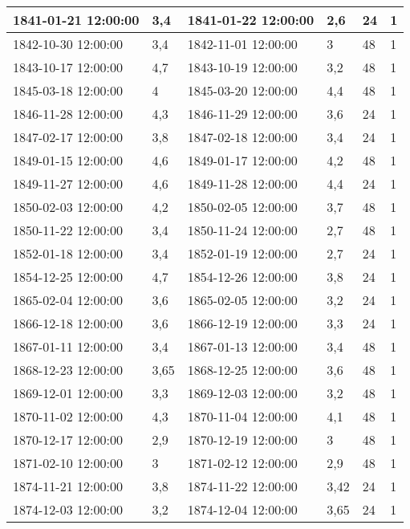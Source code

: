\documentclass[11pt]{article}
\begin{document}
\begin{longtable}{|l|p{2.3cm}|l|p{2.3cm}|l|l|}
        1841-01-21 12:00:00 & 3,4 & 1841-01-22 12:00:00 & 2,6 & 24 & 1 \\ \hline
        1842-10-30 12:00:00 & 3,4 & 1842-11-01 12:00:00 & 3 & 48 & 1 \\ \hline
        1843-10-17 12:00:00 & 4,7 & 1843-10-19 12:00:00 & 3,2 & 48 & 1 \\ \hline
        1845-03-18 12:00:00 & 4 & 1845-03-20 12:00:00 & 4,4 & 48 & 1 \\ \hline
        1846-11-28 12:00:00 & 4,3 & 1846-11-29 12:00:00 & 3,6 & 24 & 1 \\ \hline
        1847-02-17 12:00:00 & 3,8 & 1847-02-18 12:00:00 & 3,4 & 24 & 1 \\ \hline
        1849-01-15 12:00:00 & 4,6 & 1849-01-17 12:00:00 & 4,2 & 48 & 1 \\ \hline
        1849-11-27 12:00:00 & 4,6 & 1849-11-28 12:00:00 & 4,4 & 24 & 1 \\ \hline
        1850-02-03 12:00:00 & 4,2 & 1850-02-05 12:00:00 & 3,7 & 48 & 1 \\ \hline
        1850-11-22 12:00:00 & 3,4 & 1850-11-24 12:00:00 & 2,7 & 48 & 1 \\ \hline
        1852-01-18 12:00:00 & 3,4 & 1852-01-19 12:00:00 & 2,7 & 24 & 1 \\ \hline
        1854-12-25 12:00:00 & 4,7 & 1854-12-26 12:00:00 & 3,8 & 24 & 1 \\ \hline
        1865-02-04 12:00:00 & 3,6 & 1865-02-05 12:00:00 & 3,2 & 24 & 1 \\ \hline
        1866-12-18 12:00:00 & 3,6 & 1866-12-19 12:00:00 & 3,3 & 24 & 1 \\ \hline
        1867-01-11 12:00:00 & 3,4 & 1867-01-13 12:00:00 & 3,4 & 48 & 1 \\ \hline
        1868-12-23 12:00:00 & 3,65 & 1868-12-25 12:00:00 & 3,6 & 48 & 1 \\ \hline
        1869-12-01 12:00:00 & 3,3 & 1869-12-03 12:00:00 & 3,2 & 48 & 1 \\ \hline
        1870-11-02 12:00:00 & 4,3 & 1870-11-04 12:00:00 & 4,1 & 48 & 1 \\ \hline
        1870-12-17 12:00:00 & 2,9 & 1870-12-19 12:00:00 & 3 & 48 & 1 \\ \hline
        1871-02-10 12:00:00 & 3 & 1871-02-12 12:00:00 & 2,9 & 48 & 1 \\ \hline
        1874-11-21 12:00:00 & 3,8 & 1874-11-22 12:00:00 & 3,42 & 24 & 1 \\ \hline
        1874-12-03 12:00:00 & 3,2 & 1874-12-04 12:00:00 & 3,65 & 24 & 1 \\ \hline

\end{longtable}
\end{document}
